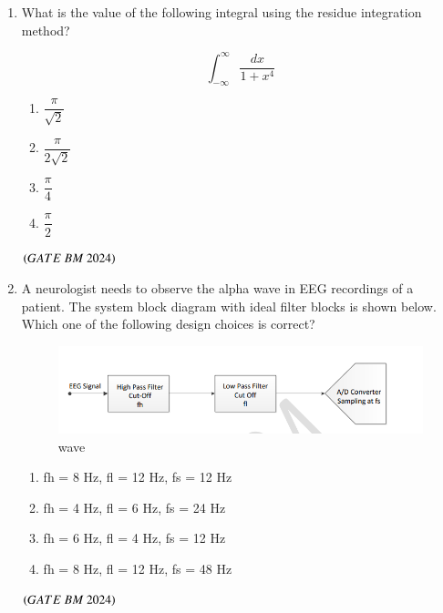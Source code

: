 \documentclass[journal,12pt,onecolumn]{IEEEtran}
\theoremstyle{remark}
\begin{document}
\begin{enumerate}
\item What is the value of the following integral using the residue integration method?

\[
\int_{-\infty}^{\infty} \frac{dx}{1+x^4}
\]

\begin{enumerate}[label=(\Alph*)]
    \item $\dfrac{\pi}{\sqrt{2}}$\\
    \item $\dfrac{\pi}{2\sqrt{2}}$\\
    \item $\dfrac{\pi}{4}$\\
    \item $\dfrac{\pi}{2}$\\
\end{enumerate}
\hfill $\brak{GATE\ BM\ 2024}$

\item A neurologist needs to observe the alpha wave in EEG recordings of a patient. The system block diagram with ideal filter blocks is shown below. Which one of the following design choices is correct?
\begin{figure}[H]
\centering
\includegraphics[width=0.8\columnwidth]{Figs/Fig 10.png}
\caption{wave}
\label{fig:placeholder}
\end{figure}
\begin{enumerate}[label=(\Alph*)]
    \item fh = 8 Hz, fl = 12 Hz, fs = 12 Hz
    \item fh = 4 Hz, fl = 6 Hz, fs = 24 Hz
    \item fh = 6 Hz, fl = 4 Hz, fs = 12 Hz
    \item fh = 8 Hz, fl = 12 Hz, fs = 48 Hz
\end{enumerate}
\hfill $\brak{GATE\ BM\ 2024}$


\end{enumerate}
\end{document}
